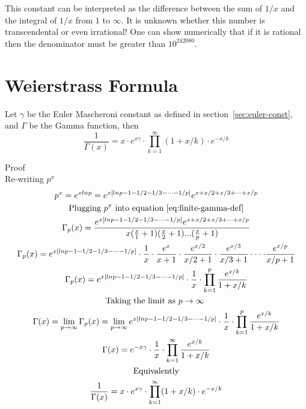 \documentclass[a4paper]{article}
\begin{document}
    This constant can be interpreted as the difference between the sum of $1/x$ and the integral of $1/x$ from $1$ to $\infty$.
    It is unknown whether this number is transcendental or even irrational!
    One can show numerically that if it is rational then the denominator must be greater than $10^{242080}$.


    \section{Weierstrass Formula}\label{sec:weierstrass}
    \begin{theorem}
        \label{partial form}
        Let $\gamma$ be the Euler Mascheroni constant as defined in section~\ref{sec:euler-const}, and $\Gamma$ be the Gamma function, then
        \begin{equation}
            \label{eq:gamma-product}
            \frac{1}{\Gamma(x)}  = x \cdot e^{x \gamma} \cdot \prod_{k=1}^{\infty} (1 + x/k) \cdot e^{-x/k}
        \end{equation}

        Proof
        \\
        Re-writing $p^x$
        \begin{gather*}
            p^x = e^{x lnp} = e^{x [lnp - 1 - 1/2 - 1/3 - \dots - 1/p]} e^{x + x/2 + x/3 + \dots + x/p} \\
            \text{Plugging $p^x$ into equation~\ref{eq:finite-gamma-def}} \\
            \Gamma_{p}(x) = \frac{e^{x [lnp - 1 - 1/2 - 1/3 - \dots - 1/p]} e^{x + x/2 + x/3 + \dots + x/p}}{x (\frac{x}{1} + 1)(\frac{x}{2} + 1)...(\frac{x}{p} + 1)}   \\
            \Gamma_{p}(x) = e^{x [lnp - 1 - 1/2 - 1/3 - \dots - 1/p]} \cdot \frac{1}{x} \cdot \frac{e^{x}}{x+1} \cdot \frac{e^{x/2}}{x/2+1} \cdot \frac{e^{x/3}}{x/3+1}
            \cdot \cdot \cdot \cdot \frac{e^{x/p}}{x/p+1}
            \\
            \Gamma_{p}(x) = e^{x [lnp - 1 - 1/2 - 1/3 - \dots - 1/p]} \cdot \frac{1}{x} \cdot \prod_{k=1}^{p} \frac{e^{x/k}}{1 + x/k} \\
            \text{Taking the limit as $p \to \infty$ }\\
            \Gamma(x) = \lim_{p \to \infty} \Gamma_{p}(x) =
            \lim_{p \to \infty} e^{x [lnp - 1 - 1/2 - 1/3 - \dots - 1/p]} \cdot \frac{1}{x} \cdot \prod_{k=1}^{p} \frac{e^{x/k}}{1 + x/k} \\
            \Gamma(x) = e^{-x \gamma} \cdot  \frac{1}{x} \cdot \prod_{k=1}^{\infty} \frac{e^{x/k}}{1 + x/k}  \\
            \text{Equivalently}\\
            \frac{1}{\Gamma(x)}  = x \cdot e^{x \gamma} \cdot \prod_{k=1}^{\infty} (1 + x/k) \cdot e^{-x/k}  \\
        \end{gather*}
    \end{theorem}
\end{document}
